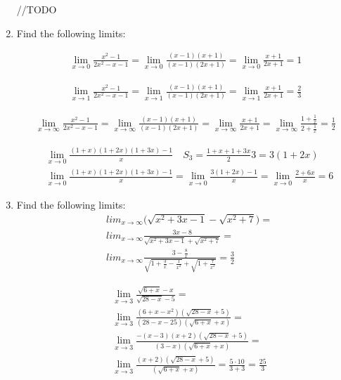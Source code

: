 \documentclass{article}
\begin{document}
\begin{enumerate}
//TODO

\item Find the following limits:


\begin{align*}
\lim_{x \to 0} \frac{x^2 - 1}{2x^2 - x - 1} = \lim_{x \to 0} \frac{(x - 1)(x + 1)}{(x - 1)(2x + 1)} =  \lim_{x \to 0} \frac{x + 1}{2x + 1} = 1
\end{align*}

\begin{align*}
\lim_{x \to 1} \frac{x^2 - 1}{2x^2 - x - 1} = \lim_{x \to 1} \frac{(x - 1)(x + 1)}{(x - 1)(2x + 1)} =  \lim_{x \to 1} \frac{x + 1}{2x + 1} = \frac{2}{3}
\end{align*}

\begin{align*}
\lim_{x \to \infty} \frac{x^2 - 1}{2x^2 - x - 1} = \lim_{x \to \infty} \frac{(x - 1)(x + 1)}{(x - 1)(2x + 1)} =  \lim_{x \to \infty} \frac{x + 1}{2x + 1} = \lim_{x \to \infty} \frac{1 + \frac{1}{x}}{2 + \frac{1}{x}} = \frac{1}{2}
\end{align*}

\begin{align*}
&\lim_{x \to 0} \frac{(1 + x)(1 + 2x)(1 + 3x) - 1}{x} \quad S_3 = \frac{1 + x + 1 + 3x}{2}3 = 3(1 + 2x)\\
&\lim_{x \to 0} \frac{(1 + x)(1 + 2x)(1 + 3x) - 1}{x} = \lim_{x \to 0} \frac{3(1 + 2x) - 1}{x} = \lim_{x \to 0} \frac{2 + 6x}{x} = 6
\end{align*}

\item Find the following limits:
\begin{align*}
&lim_{x \to \infty} \bigg(\sqrt{x^2 + 3x - 1} - \sqrt{x^2 + 7}\bigg) =\\
&lim_{x \to \infty} \frac{3x - 8}{\sqrt{x^2 + 3x - 1} + \sqrt{x^2 + 7}} =\\
&lim_{x \to \infty} \frac{3 - \frac{8}{x}}{\sqrt{1 + \frac{3}{x} - \frac{1}{x^2}} + \sqrt{1 + \frac{7}{x^2}}} = \frac{3}{2}
\end{align*}

\begin{align*}
&\lim_{x \to 3} \frac{\sqrt{6+x} - x}{\sqrt{28 - x} - 5} =\\
&\lim_{x \to 3} \frac{(6 + x - x^2)(\sqrt{28-x} + 5)}{(28 - x - 25)(\sqrt{6 + x} + x)} =\\
&\lim_{x \to 3} \frac{-(x - 3)(x + 2)(\sqrt{28-x} + 5)}{(3 - x)(\sqrt{6 + x} + x)} =\\
&\lim_{x \to 3} \frac{(x + 2)(\sqrt{28-x} + 5)}{(\sqrt{6 + x} + x)} = \frac{5 \cdot 10}{3 + 3} = \frac{25}{3}
\end{align*}


\end{enumerate}
\end{document}
